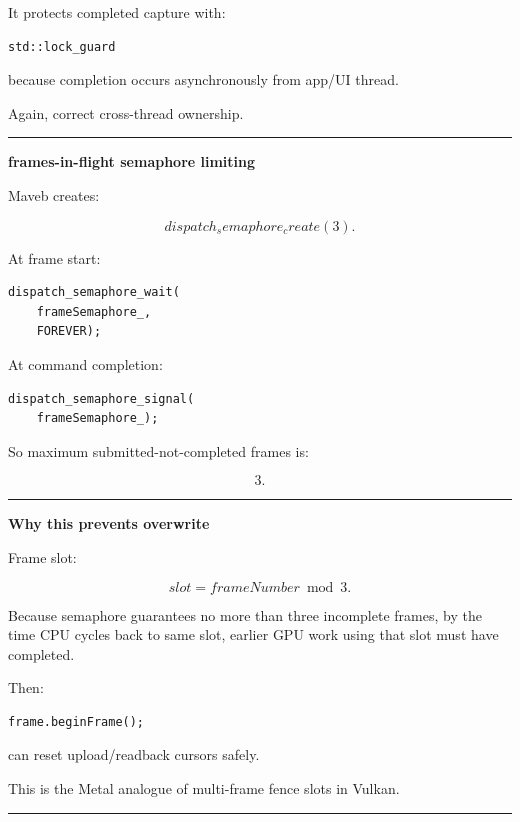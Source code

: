 It protects completed capture with:

\begin{verbatim}
std::lock_guard
\end{verbatim}

because completion occurs asynchronously from app/UI thread.

Again, correct cross-thread ownership.

\begin{center}\rule{0.5\linewidth}{0.5pt}\end{center}

\textbf{frames-in-flight semaphore limiting}

Maveb creates:

\[
dispatch_semaphore_create(3).
\]

At frame start:

\begin{verbatim}
dispatch_semaphore_wait(
    frameSemaphore_,
    FOREVER);
\end{verbatim}

At command completion:

\begin{verbatim}
dispatch_semaphore_signal(
    frameSemaphore_);
\end{verbatim}

So maximum submitted-not-completed frames is:

\[
\boxed{3}.
\]

\begin{center}\rule{0.5\linewidth}{0.5pt}\end{center}

\textbf{Why this prevents overwrite}

Frame slot:

\[
slot=
frameNumber\bmod3.
\]

Because semaphore guarantees no more than three incomplete frames, by the time CPU cycles back to same slot, earlier GPU work using that slot must have completed.

Then:

\begin{verbatim}
frame.beginFrame();
\end{verbatim}

can reset upload/readback cursors safely.

This is the Metal analogue of multi-frame fence slots in Vulkan.

\begin{center}\rule{0.5\linewidth}{0.5pt}\end{center}

